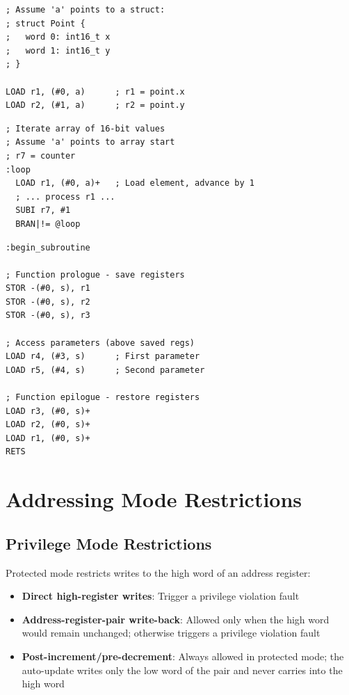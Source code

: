 \begin{example}
	\begin{lstlisting}
; Assume 'a' points to a struct:
; struct Point {
;   word 0: int16_t x
;   word 1: int16_t y
; }

LOAD r1, (#0, a)      ; r1 = point.x
LOAD r2, (#1, a)      ; r2 = point.y
	\end{lstlisting}
	\caption{Structure Access}
\end{example}

\begin{example}
	\begin{lstlisting}
; Iterate array of 16-bit values
; Assume 'a' points to array start
; r7 = counter
:loop
  LOAD r1, (#0, a)+   ; Load element, advance by 1
  ; ... process r1 ...
  SUBI r7, #1
  BRAN|!= @loop
	\end{lstlisting}
	\caption{Array Iteration}
\end{example}

\begin{example}
	\begin{lstlisting}
:begin_subroutine

; Function prologue - save registers
STOR -(#0, s), r1
STOR -(#0, s), r2
STOR -(#0, s), r3

; Access parameters (above saved regs)
LOAD r4, (#3, s)      ; First parameter
LOAD r5, (#4, s)      ; Second parameter

; Function epilogue - restore registers
LOAD r3, (#0, s)+
LOAD r2, (#0, s)+
LOAD r1, (#0, s)+
RETS
	\end{lstlisting}
	\caption{Stack Frame}
\end{example}

\section{Addressing Mode Restrictions}

\subsection{Privilege Mode Restrictions}

Protected mode restricts writes to the high word of an address register:

\begin{itemize}
	\item \textbf{Direct high-register writes}: Trigger a privilege violation fault
	\item \textbf{Address-register-pair write-back}: Allowed only when the high word would remain unchanged; otherwise triggers a privilege violation fault
	\item \textbf{Post-increment/pre-decrement}: Always allowed in protected mode; the auto-update writes only the low word of the pair and never carries into the high word
\end{itemize}

